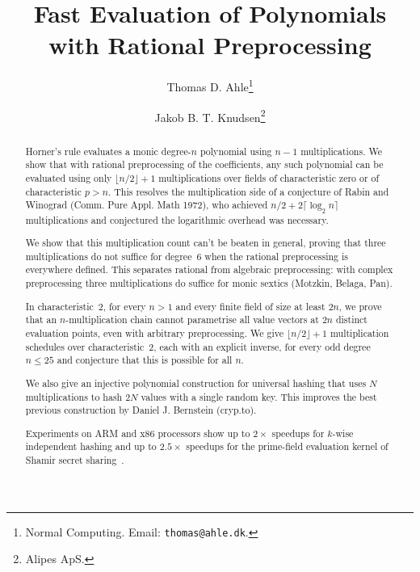 


\title{Fast Evaluation of Polynomials with Rational Preprocessing}
\author{Thomas D. Ahle\thanks{Normal Computing. Email: \texttt{thomas@ahle.dk}.} \and Jakob B. T. Knudsen\thanks{Alipes ApS.}}




\maketitle

\begin{abstract}
   Horner's rule evaluates a monic degree-$n$ polynomial using $n-1$ multiplications.
   We show that with rational preprocessing of the coefficients, any such polynomial
   can be evaluated using only $\lfloor n/2 \rfloor + 1$ multiplications over
   fields of characteristic zero or of characteristic $p>n$.
   This resolves the multiplication side of a conjecture of Rabin and Winograd (Comm. Pure Appl. Math 1972), who achieved
   $n/2 + 2\lceil\log_2 n\rceil$ multiplications and conjectured the
   logarithmic overhead was necessary.

   We show that this multiplication count can't be beaten in general,
   proving that three multiplications do not suffice for degree~$6$ when the
   rational preprocessing is everywhere defined.
   This separates rational from algebraic preprocessing: with complex
   preprocessing three multiplications do suffice for monic sextics
   (Motzkin, Belaga, Pan).

   In characteristic~2, for every $n>1$ and every finite field of size at least $2n$, we prove that
   an $n$-multiplication chain cannot parametrise all value vectors at $2n$
   distinct evaluation points, even with arbitrary preprocessing.
   We give $\lfloor n/2 \rfloor + 1$ multiplication schedules over
   characteristic~2, each with an explicit inverse, for every odd degree
   $n\le 25$ and conjecture that this is possible for all $n$.

   We also give an injective polynomial construction for universal hashing that uses
   $N$ multiplications to hash $2N$ values with a single random key.
   This improves the best previous construction by Daniel J. Bernstein (cryp.to).

   Experiments on ARM and x86 processors show up to $2\times$ speedups for
   $k$-wise independent hashing and up to $2.5\times$ speedups for
   the prime-field evaluation kernel of Shamir secret sharing~\cite{shamir1979share}.
\end{abstract}


